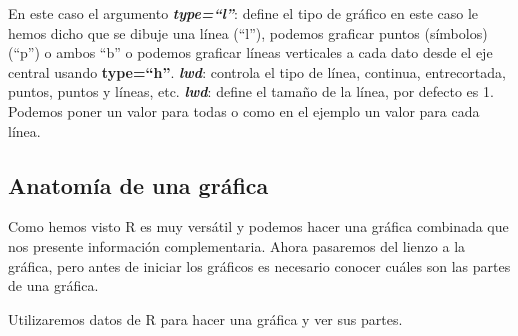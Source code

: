 \documentclass[]{article}
\begin{document}
En este caso el argumento \emph{\textbf{type=``l''}}: define el tipo de
gráfico en este caso le hemos dicho que se dibuje una línea (``l''),
podemos graficar puntos (símbolos) (``p'') o ambos ``b'' o podemos
graficar líneas verticales a cada dato desde el eje central usando
\textbf{type=``h''}. \emph{\textbf{lwd}}: controla el tipo de línea,
continua, entrecortada, puntos, puntos y líneas, etc.
\emph{\textbf{lwd}}: define el tamaño de la línea, por defecto es 1.
Podemos poner un valor para todas o como en el ejemplo un valor para
cada línea.

\subsection{Anatomía de una gráfica}\label{anatomia-de-una-grafica}

Como hemos visto R es muy versátil y podemos hacer una gráfica combinada
que nos presente información complementaria. Ahora pasaremos del lienzo
a la gráfica, pero antes de iniciar los gráficos es necesario conocer
cuáles son las partes de una gráfica.

Utilizaremos datos de R para hacer una gráfica y ver sus partes.
\end{document}
